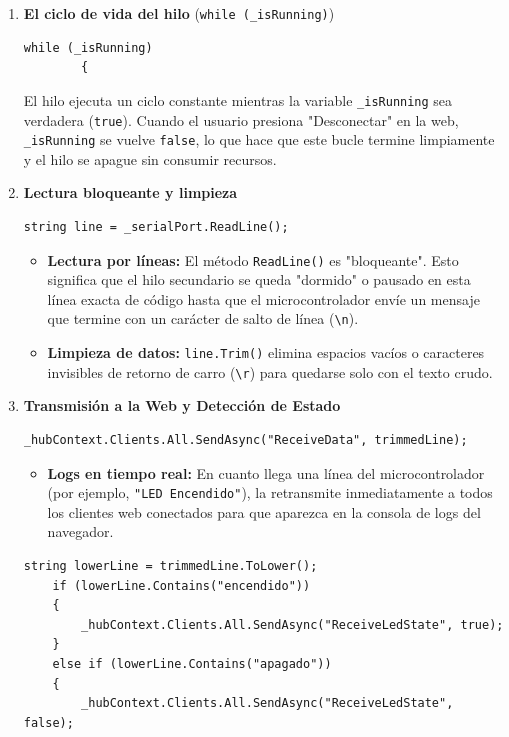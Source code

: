 \documentclass[
10pt, %
a4paper, %
oneside, %
headinclude,footinclude, %
BCOR5mm, %
]{scrartcl}
\begin{document}
\begin{enumerate}
	\item \textbf{El ciclo de vida del hilo} (\texttt{while (\_isRunning)})
	\begin{lstlisting}[style=VSCodeDark]
		while (_isRunning)
		{\end{lstlisting}
	El hilo ejecuta un ciclo constante mientras la variable \texttt{\_isRunning} sea verdadera (\texttt{true}). Cuando el usuario presiona "Desconectar" en la web, \texttt{\_isRunning} se vuelve \texttt{false}, lo que hace que este bucle termine limpiamente y el hilo se apague sin consumir recursos.
	\item \textbf{Lectura bloqueante y limpieza}
	\begin{lstlisting}[style=VSCodeDark]
		string line = _serialPort.ReadLine();
	\end{lstlisting}
	\begin{itemize}
		\item \textbf{Lectura por líneas:} El método \texttt{ReadLine()} es "bloqueante". Esto significa que el hilo secundario se queda "dormido" o pausado en esta línea exacta de código hasta que el microcontrolador envíe un mensaje que termine con un carácter de salto de línea (\texttt{\textbackslash n}).
		\item \textbf{Limpieza de datos:} \texttt{line.Trim()} elimina espacios vacíos o caracteres invisibles de retorno de carro (\texttt{\textbackslash r}) para quedarse solo con el texto crudo.
	\end{itemize}
	\item \textbf{ Transmisión a la Web y Detección de Estado}
	\begin{lstlisting}[style=VSCodeDark]
	_hubContext.Clients.All.SendAsync("ReceiveData", trimmedLine);\end{lstlisting}
	\begin{itemize}
		\item \textbf{Logs en tiempo real:} En cuanto llega una línea del microcontrolador (por ejemplo, \texttt{"LED Encendido"}), la retransmite inmediatamente a todos los clientes web conectados para que aparezca en la consola de logs del navegador.
	\end{itemize}
	\begin{lstlisting}[style=VSCodeDark]
	string lowerLine = trimmedLine.ToLower();
	if (lowerLine.Contains("encendido"))
	{
		_hubContext.Clients.All.SendAsync("ReceiveLedState", true);
	}
	else if (lowerLine.Contains("apagado"))
	{
		_hubContext.Clients.All.SendAsync("ReceiveLedState", false);

\end{lstlisting}
\end{enumerate}
\end{document}
